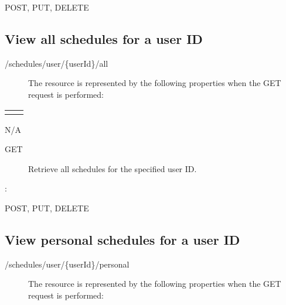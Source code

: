 \documentclass[letterpaper,10pt,english]{sphinxmanual}
\begin{document}
 POST, PUT, DELETE


\subsection{View all schedules for a user ID}
\label{\detokenize{restapi:view-all-schedules-for-a-user-id}}
 /schedules/user/\{userId\}/all
\begin{description}
\item[{}] \leavevmode
The resource is represented by the following properties when the GET request is performed:

\end{description}


\begin{savenotes}\sphinxattablestart
\centering
\begin{tabulary}{\linewidth}[t]{|T|T|}
\hline

&
\\
\hline&\\
\hline
\end{tabulary}
\par
\sphinxattableend\end{savenotes}

 N/A
\begin{description}
\item[{ GET}] \leavevmode
Retrieve all schedules for the specified user ID.

\end{description}

:

\begin{sphinxVerbatim}[commandchars=\\\{\}]
\end{sphinxVerbatim}

 POST, PUT, DELETE


\subsection{View personal schedules for a user ID}
\label{\detokenize{restapi:view-personal-schedules-for-a-user-id}}
 /schedules/user/\{userId\}/personal
\begin{description}
\item[{}] \leavevmode
The resource is represented by the following properties when the GET request is performed:

\end{description}
\end{document}
